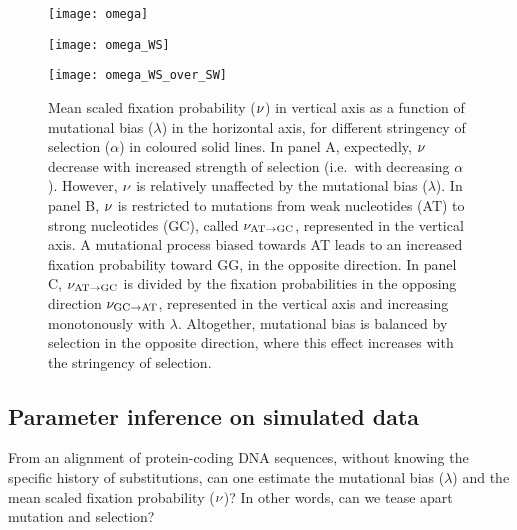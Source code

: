 \begin{figure}[htbp]
    \centering
    \begin{minipage}{0.32\linewidth}
        \texttt{[image: omega]}
    \end{minipage}
    \hfill
    \begin{minipage}{0.32\linewidth}
        \texttt{[image: omega\_WS]}
    \end{minipage}
    \hfill
    \begin{minipage}{0.32\linewidth}
        \texttt{[image: omega\_WS\_over\_SW]}
    \end{minipage}
    \hfill
    \caption[Mean scaled fixation probability as a function of the parameters]{
    Mean scaled fixation probability ($\nu$) in vertical axis as a function of mutational bias ($\lambda$) in the horizontal axis, for different stringency of selection ($\alpha$) in coloured solid lines.
    In panel A, expectedly, $\nu$ decrease with increased strength of selection (i.e.~with decreasing $\alpha$).
    However, $\nu$ is relatively unaffected by the mutational bias ($\lambda$).
    In panel B, $\nu$ is restricted to mutations from weak nucleotides (AT) to strong nucleotides (GC), called $\nu_{\text{AT} \rightarrow \text{GC}}$, represented in the vertical axis.
    A mutational process biased towards AT leads to an increased fixation probability toward GG, in the opposite direction.
    In panel C, $\nu_{\text{AT} \rightarrow \text{GC}}$ is divided by the fixation probabilities in the opposing direction $\nu_{\text{GC} \rightarrow \text{AT}}$, represented in the vertical axis and increasing monotonously with $\lambda$.
    Altogether, mutational bias is balanced by selection in the opposite direction, where this effect increases with the stringency of selection.
    }
    \label{fig:mut-bias-omega-WS}
\end{figure}

\subsection{Parameter inference on simulated data}
\label{subsec:parameter-inference-on-simulated-data}

From an alignment of protein-coding \acrshort{DNA} sequences, without knowing the specific history of \glspl{substitution}, can one estimate the mutational bias ($\lambda$) and the mean scaled fixation probability ($\nu$)?
In other words, can we tease apart mutation and selection?

